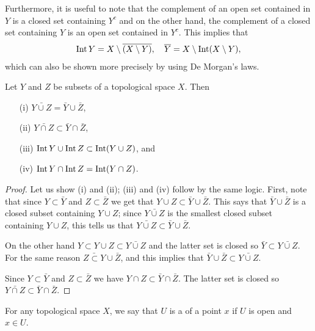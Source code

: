Furthermore, it is useful to note that the complement of an open set contained in $Y$ is a closed set containing $Y^c$ and on the other hand, the complement of a closed set containing $Y$ is an open set contained in $Y^c$. This implies that
\begin{align}
  \label{int-versus-closure}
  \operatorname{Int} Y = X \setminus \overline{(X \setminus Y)}, \quad \overline{Y} = X \setminus \operatorname{Int}(X \setminus Y),
\end{align}
which can also be shown more precisely by using De Morgan's laws.
\begin{prop}
  Let $Y$ and $Z$ be subsets of a topological space $X$. Then
  \begin{enumerate}
    \item[(i)] $\bar{Y \cup Z} = \bar Y \cup \bar Z$,
    \item[(ii)] $\bar{Y \cap Z} \subset \bar Y \cap \bar Z$,
    \item[(iii)] $\operatorname{Int} Y \cup \operatorname{Int} Z \subset \operatorname{Int}(Y \cup Z)$, and
    \item[(iv)] $\operatorname{Int} Y \cap \operatorname{Int} Z = \operatorname{Int} (Y \cap Z)$.
  \end{enumerate}
\end{prop}
\begin{proof}
  Let us show (i) and (ii); (iii) and (iv) follow by the same logic. First, note that since $Y \subset \bar Y$ and $Z \subset \bar Z$ we get that $Y \cup Z \subset \bar Y \cup \bar Z$. This says that $\bar Y \cup \bar Z$ is a closed subset containing $Y \cup Z$; since $\bar{Y \cup Z}$ is the smallest closed subset containing $Y \cup Z$, this tells us that $\bar{Y \cup Z} \subset \bar Y \cup \bar Z$.
  
  On the other hand $Y \subset Y \cup Z \subset \bar {Y \cup Z}$ and the latter set is closed so $\bar Y \subset \bar{Y \cup Z}$. For the same reason $\bar{Z \subset Y} \cup \bar Z$, and this implies that $\bar Y \cup \bar Z \subset \bar{Y \cup Z}$.
  
  Since $Y \subset \bar Y$ and $Z \subset \bar Z$ we have $Y \cap Z \subset \bar Y \cap \bar Z$. The latter set is closed so $\bar {Y\cap Z} \subset \bar Y \cap \bar Z$.
\end{proof}
For any topological space $X$, we say that $U$ is a  of a point $x$ if $U$ is open and $x \in U$.


